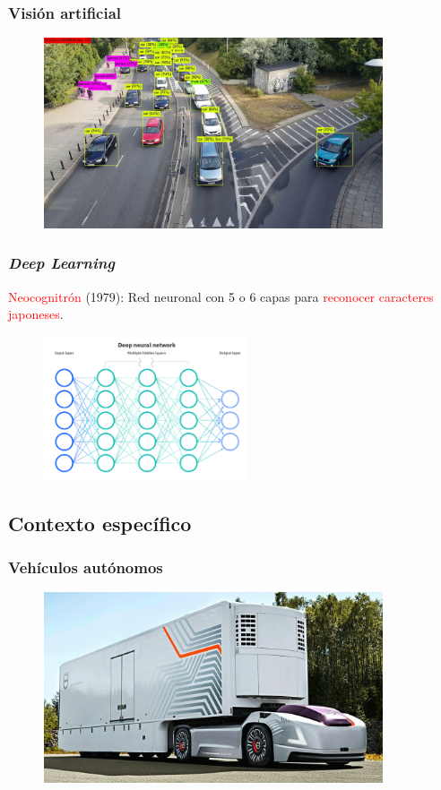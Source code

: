 \documentclass{beamer}
\begin{document}
\begin{frame}
	\frametitle{Visión artificial}
	\begin{figure}
		\centering
		\includegraphics[width=10cm]{figs/yolo}
	\end{figure}
\end{frame}

\begin{frame}
	\frametitle{\textit{Deep Learning}}
	\begin{outline}
		\1 \textcolor{red}{Neocognitrón} (1979): Red neuronal con 5 o 6 capas para \textcolor{red}{reconocer caracteres japoneses}.
	\end{outline}
	\begin{figure}
		\centering
		\includegraphics[width=6cm]{figs/neuralnetwork}
	\end{figure}
\end{frame}

\subsection{Contexto específico}
\begin{frame}
	\frametitle{Vehículos autónomos}
	\begin{figure}
		\centering
		\includegraphics[width=10cm]{figs/volvovera}
	\end{figure}
\end{frame}
\end{document}

